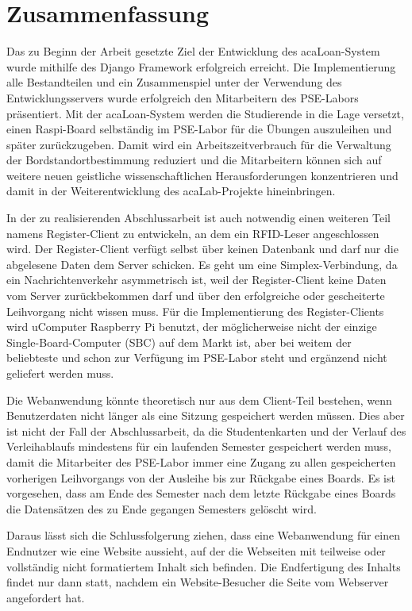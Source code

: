 \chapter{Zusammenfassung}
\label{sec:results}
Das zu Beginn der Arbeit gesetzte Ziel der Entwicklung des acaLoan-System wurde mithilfe des Django Framework erfolgreich erreicht. Die Implementierung alle Bestandteilen und ein Zusammenspiel unter der Verwendung des Entwicklungsservers wurde erfolgreich den Mitarbeitern des PSE-Labors präsentiert. Mit der acaLoan-System werden die Studierende in die Lage versetzt, einen Raspi-Board selbständig im PSE-Labor für die Übungen auszuleihen und später zurückzugeben. Damit wird ein Arbeitszeitverbrauch für die Verwaltung der Bordstandortbestimmung reduziert und die Mitarbeitern können sich auf weitere neuen geistliche wissenschaftlichen Herausforderungen konzentrieren und damit in der Weiterentwicklung des acaLab-Projekte hineinbringen.  

In der zu realisierenden Abschlussarbeit ist auch notwendig einen weiteren Teil namens Register-Client zu entwickeln, an dem ein RFID-Leser angeschlossen wird. Der Register-Client verfügt selbst über keinen Datenbank und darf nur die abgelesene Daten dem Server schicken. Es geht um eine Simplex-Verbindung, da ein Nachrichtenverkehr asymmetrisch ist, weil der Register-Client keine Daten vom Server zurückbekommen darf und über den erfolgreiche oder gescheiterte Leihvorgang nicht wissen muss. Für die Implementierung des Register-Clients wird uComputer Raspberry Pi benutzt, der möglicherweise nicht der einzige Single-Board-Computer (SBC) auf dem Markt ist, aber bei weitem der beliebteste und schon zur Verfügung im PSE-Labor steht und ergänzend nicht geliefert werden muss. 

Die Webanwendung könnte theoretisch nur aus dem Client-Teil bestehen, wenn Benutzerdaten nicht länger als eine Sitzung gespeichert werden müssen. Dies aber ist nicht der Fall der Abschlussarbeit, da die Studentenkarten und der Verlauf des Verleihablaufs mindestens für ein laufenden Semester gespeichert werden muss, damit die Mitarbeiter des PSE-Labor immer eine Zugang zu allen gespeicherten vorherigen Leihvorgangs von der Ausleihe bis zur Rückgabe eines Boards. Es ist vorgesehen, dass am Ende des Semester nach dem letzte Rückgabe eines Boards die Datensätzen des zu Ende gegangen Semesters gelöscht wird. 

Daraus lässt sich die Schlussfolgerung ziehen, dass eine Webanwendung für einen Endnutzer wie eine Website aussieht, auf der  die Webseiten mit teilweise oder vollständig nicht formatiertem Inhalt sich befinden. Die Endfertigung des Inhalts findet nur dann statt, nachdem ein Website-Besucher die Seite vom Webserver angefordert hat. 


